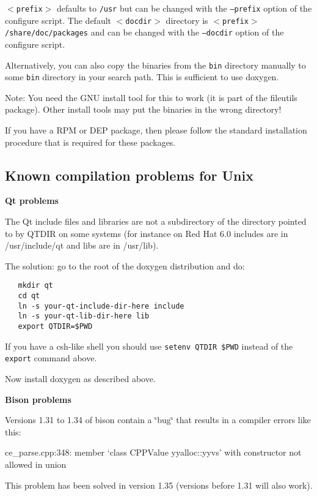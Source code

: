 {\tt $<$prefix$>$} defaults to {\tt /usr} but can be changed with the {\tt --prefix} option of the configure script. The default {\tt $<$docdir$>$} directory is {\tt $<$prefix$>$/share/doc/packages} and can be changed with the {\tt --docdir} option of the configure script.

Alternatively, you can also copy the binaries from the {\tt bin} directory manually to some {\tt bin} directory in your search path. This is sufficient to use doxygen.

\begin{Desc}
\item[Note:]You need the GNU install tool for this to work (it is part of the fileutils package). Other install tools may put the binaries in the wrong directory!\end{Desc}
If you have a RPM or DEP package, then please follow the standard installation procedure that is required for these packages.\subsection{Known compilation problems for Unix}\label{install_unix_problems}
{\bf Qt problems}

The Qt include files and libraries are not a subdirectory of the directory pointed to by QTDIR on some systems (for instance on Red Hat 6.0 includes are in /usr/include/qt and libs are in /usr/lib).

The solution: go to the root of the doxygen distribution and do: 

\footnotesize\begin{verbatim}
   mkdir qt
   cd qt
   ln -s your-qt-include-dir-here include
   ln -s your-qt-lib-dir-here lib
   export QTDIR=$PWD
\end{verbatim}
\normalsize


If you have a csh-like shell you should use {\tt setenv QTDIR \$PWD} instead of the {\tt export} command above.

Now install doxygen as described above.

{\bf Bison problems}

Versions 1.31 to 1.34 of bison contain a \char`\"{}bug\char`\"{} that results in a compiler errors like this:

ce\_\-parse.cpp:348: member `class CPPValue yyalloc::yyvs' with constructor not allowed in union

This problem has been solved in version 1.35 (versions before 1.31 will also work).

